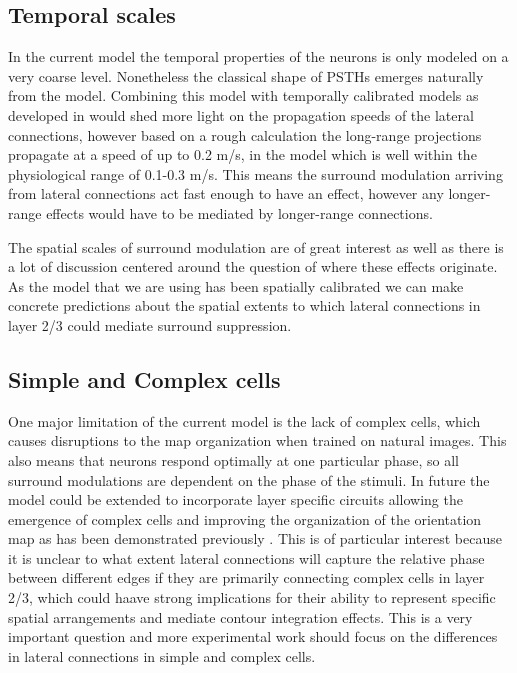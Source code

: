 \subsection{Temporal scales}

In the current model the temporal properties of the neurons is only
modeled on a very coarse level. Nonetheless the classical shape of
PSTHs emerges naturally from the model. Combining this model with
temporally calibrated models as developed in \citep{StevensPhD2016}
would shed more light on the propagation speeds of the lateral
connections, however based on a rough calculation the long-range
projections propagate at a speed of up to 0.2 m/s, in the model which
is well within the physiological range of 0.1-0.3 m/s. This means the
surround modulation arriving from lateral connections act fast enough
to have an effect, however any longer-range effects would have to be
mediated by longer-range connections.

The spatial scales of surround modulation are of great interest as
well as there is a lot of discussion centered around the question of
where these effects originate. As the model that we are using has been
spatially calibrated we can make concrete predictions about the
spatial extents to which lateral connections in layer 2/3 could
mediate surround suppression.

\subsection{Simple and Complex cells}

One major limitation of the current model is the lack of complex
cells, which causes disruptions to the map organization when trained
on natural images. This also means that neurons respond optimally at
one particular phase, so all surround modulations are dependent on the
phase of the stimuli. In future the model could be extended to
incorporate layer specific circuits allowing the emergence of complex
cells and improving the organization of the orientation map as has
been demonstrated previously \citep{Antolik2010}. This is of
particular interest because it is unclear to what extent lateral
connections will capture the relative phase between different edges if
they are primarily connecting complex cells in layer 2/3, which could
haave strong implications for their ability to represent specific
spatial arrangements and mediate contour integration effects. This is
a very important question and more experimental work should focus on
the differences in lateral connections in simple and complex cells.

